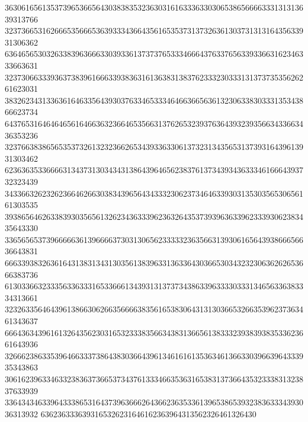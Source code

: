 36306165613537396536656430383835323630316163336330306538656666333131313639313766
32373665316266653566653639333436643561653537313732636130373131316435633931306362
63646565303263383963666330393361373737653334666437633765633933663162346333663631
32373066333936373839616663393836316136383138376233323033313137373535626261623031
38326234313363616463356439303763346533346466366563613230633830333135343866623734
64376531646464656164663632366465356631376265323937636439323935663433663436353236
32376638386565353732613232366265343933633061373231343565313739316439613931303462
62363635336666313437313034343138643964656238376137343934363334616664393732323439
34336632623262366462663038343965643433323062373464633930313530356530656161303535
39386564626338393035656132623436333962363264353739396363396233393062383435643330
33656565373966666361396666373031306562333332363566313930616564393866656636643831
66633938326361643138313431303561383963313633643036653034323230636262653666383736
61303366323335633633316533666134393131373734386339633330333134656336383334313661
32326335646439613866306266356666383561653830643131303665326635396237363461343637
66643634396161326435623031653233383566343831366561383332393839383533623661643936
32666238633539646633373864383036643961346161613536346136633039663964333935343863
30616239633463323836373665373437613334663536316538313736643532333831323837633939
33643434633964333865316437396366626436623635336139653865393238363334393036313932
6362363336393165326231646162363964313562326461326430
